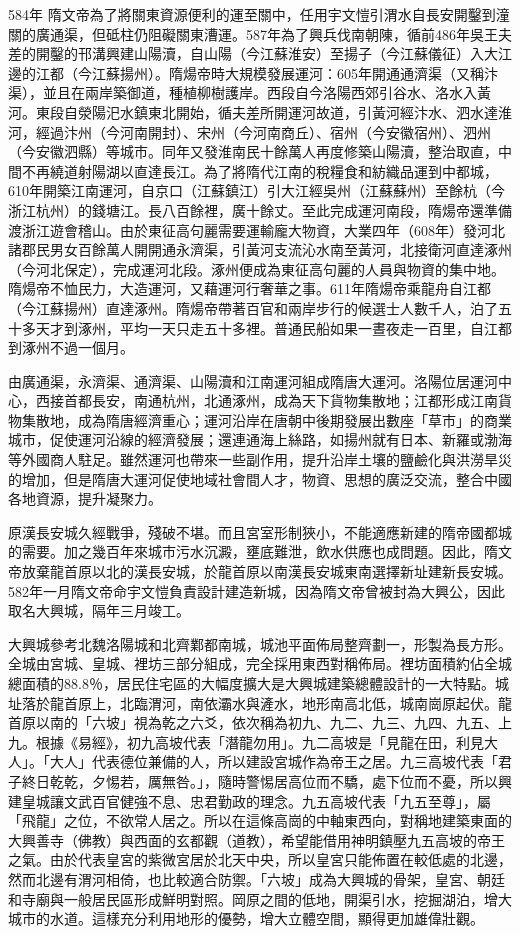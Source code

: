 584年 隋文帝為了將關東資源便利的運至關中，任用宇文愷引渭水自長安開鑿到潼關的廣通渠，但砥柱仍阻礙關東漕運。587年為了興兵伐南朝陳，循前486年吳王夫差的開鑿的邗溝興建山陽瀆，自山陽（今江蘇淮安）至揚子（今江蘇儀征）入大江邊的江都（今江蘇揚州）。隋煬帝時大規模發展運河：605年開通通濟渠（又稱汴渠），並且在兩岸築御道，種植柳樹護岸。西段自今洛陽西郊引谷水、洛水入黃河。東段自滎陽汜水鎮東北開始，循夫差所開運河故道，引黃河經汴水、泗水達淮河，經過汴州（今河南開封）、宋州（今河南商丘）、宿州（今安徽宿州）、泗州（今安徽泗縣）等城市。同年又發淮南民十餘萬人再度修築山陽瀆，整治取直，中間不再繞道射陽湖以直達長江。為了將隋代江南的稅糧食和紡織品運到中都城，610年開築江南運河，自京口（江蘇鎮江）引大江經吳州（江蘇蘇州）至餘杭（今浙江杭州）的錢塘江。長八百餘裡，廣十餘丈。至此完成運河南段，隋煬帝還準備渡浙江遊會稽山。由於東征高句麗需要運輸龐大物資，大業四年（608年）發河北諸郡民男女百餘萬人開開通永濟渠，引黃河支流沁水南至黃河，北接衛河直達涿州（今河北保定），完成運河北段。涿州便成為東征高句麗的人員與物資的集中地。隋煬帝不恤民力，大造運河，又藉運河行奢華之事。611年隋煬帝乘龍舟自江都（今江蘇揚州）直達涿州。隋煬帝帶著百官和兩岸步行的候選士人數千人，泊了五十多天才到涿州，平均一天只走五十多裡。普通民船如果一晝夜走一百里，自江都到涿州不過一個月。

由廣通渠，永濟渠、通濟渠、山陽瀆和江南運河組成隋唐大運河。洛陽位居運河中心，西接首都長安，南通杭州，北通涿州，成為天下貨物集散地；江都形成江南貨物集散地，成為隋唐經濟重心；運河沿岸在唐朝中後期發展出數座「草市」的商業城市，促使運河沿線的經濟發展；還連通海上絲路，如揚州就有日本、新羅或渤海等外國商人駐足。雖然運河也帶來一些副作用，提升沿岸土壤的鹽鹼化與洪澇旱災的增加，但是隋唐大運河促使地域社會間人才，物資、思想的廣泛交流，整合中國各地資源，提升凝聚力。

原漢長安城久經戰爭，殘破不堪。而且宮室形制狹小，不能適應新建的隋帝國都城的需要。加之幾百年來城市污水沉澱，壅底難泄，飲水供應也成問題。因此，隋文帝放棄龍首原以北的漢長安城，於龍首原以南漢長安城東南選擇新址建新長安城。582年一月隋文帝命宇文愷負責設計建造新城，因為隋文帝曾被封為大興公，因此取名大興城，隔年三月竣工。

大興城參考北魏洛陽城和北齊鄴都南城，城池平面佈局整齊劃一，形製為長方形。全城由宮城、皇城、裡坊三部分組成，完全採用東西對稱佈局。裡坊面積約佔全城總面積的88.8％，居民住宅區的大幅度擴大是大興城建築總體設計的一大特點。城址落於龍首原上，北臨渭河，南依灞水與滻水，地形南高北低，城南崗原起伏。龍首原以南的「六坡」視為乾之六爻，依次稱為初九、九二、九三、九四、九五、上九。根據《易經》，初九高坡代表「潛龍勿用」。九二高坡是「見龍在田，利見大人」。「大人」代表德位兼備的人，所以建設宮城作為帝王之居。九三高坡代表「君子終日乾乾，夕惕若，厲無咎。」，隨時警惕居高位而不驕，處下位而不憂，所以興建皇城讓文武百官健強不息、忠君勤政的理念。九五高坡代表「九五至尊」，屬「飛龍」之位，不欲常人居之。所以在這條高崗的中軸東西向，對稱地建築東面的大興善寺（佛教）與西面的玄都觀（道教），希望能借用神明鎮壓九五高坡的帝王之氣。由於代表皇宮的紫微宮居於北天中央，所以皇宮只能佈置在較低處的北邊，然而北邊有渭河相倚，也比較適合防禦。「六坡」成為大興城的骨架，皇宮、朝廷和寺廟與一般居民區形成鮮明對照。岡原之間的低地，開渠引水，挖掘湖泊，增大城市的水道。這樣充分利用地形的優勢，增大立體空間，顯得更加雄偉壯觀。

